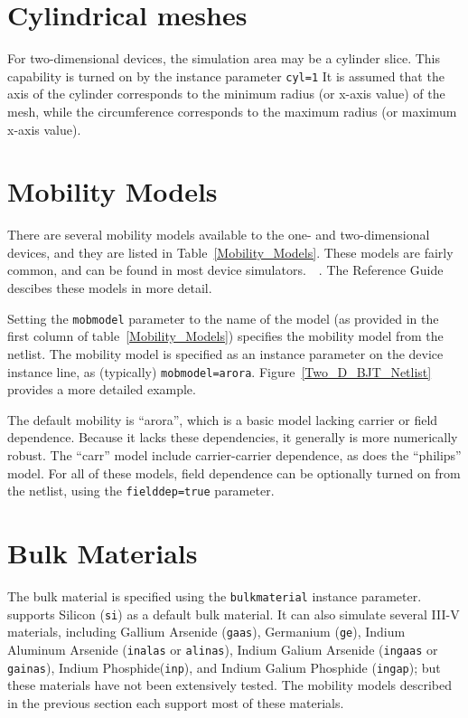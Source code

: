 \section{Cylindrical meshes}
For two-dimensional devices, the simulation area may be a cylinder slice.  
This capability is turned on by the instance parameter {\tt cyl=1} 
It is assumed that the
axis of the cylinder corresponds to the minimum radius (or x-axis value) of the 
mesh, while the circumference corresponds to the maximum radius (or maximum x-axis value).  

\section{Mobility Models}
\label{PDE_Mobility}
There are several mobility models available to the one- and two-dimensional 
devices, and they are listed in Table~\ref{Mobility_Models}.
These models are fairly common, and can be found in most device
simulators.~\cite{Yu}~\cite{DaVinci}. The \Xyce{} Reference 
Guide\ReferenceGuide{} descibes these models in more detail.


Setting the {\texttt{mobmodel}} parameter to the name of the model (as provided 
in the first column of table~\ref{Mobility_Models}) specifies the mobility model 
from the netlist. The mobility model is specified as an instance parameter on the 
device instance line, as (typically) {\texttt {mobmodel=arora}}.
Figure~\ref{Two_D_BJT_Netlist} provides a more detailed 
example.

The default mobility is ``arora'', which is a basic model lacking carrier or field dependence.  
Because it lacks these dependencies, it generally is more numerically robust.  The ``carr'' model
include carrier-carrier dependence, as does the ``philips'' model.  For all of these models,
field dependence can be optionally turned on from the netlist, using the \texttt{fielddep=true} parameter.

\section{Bulk Materials}
\label{PDE_Bulk_Material}
The bulk material is specified using the \texttt{bulkmaterial} instance
parameter.  \Xyce{} supports Silicon (\texttt{si}) as a default bulk material.  
It can also simulate several III-V materials, including Gallium Arsenide (\texttt{gaas}), Germanium (\texttt{ge}), Indium Aluminum Arsenide (\texttt{inalas}  or \texttt{alinas}),
Indium Galium Arsenide (\texttt{ingaas} or \texttt{gainas}), Indium Phosphide(\texttt{inp}), and
Indium Galium Phosphide (\texttt{ingap}); but these materials have not been extensively tested.
The mobility models described in the previous section each support most of these materials.

